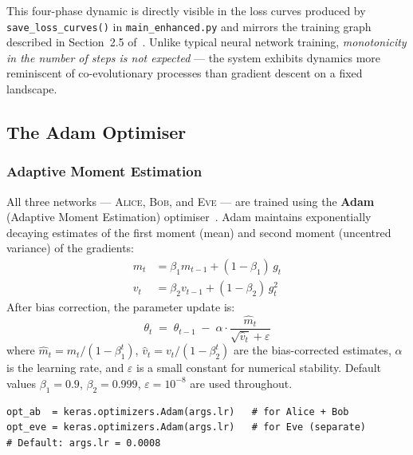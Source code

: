 \documentclass[12pt, a4paper]{article}
\newcommand{\alice}{\textsc{Alice}}
\newcommand{\bob}{\textsc{Bob}}
\newcommand{\eve}{\textsc{Eve}}
\newcommand{\code}[1]{\texttt{\color{CodeRed}#1}}
\begin{document}
This four-phase dynamic is directly visible in the loss curves produced
by \code{save\_loss\_curves()} in \code{main\_enhanced.py} and mirrors
the training graph described in Section~2.5 of~\cite{abadi2016learning}.
Unlike typical neural network training, \emph{monotonicity in the number
of steps is not expected} — the system exhibits dynamics more reminiscent
of co-evolutionary processes than gradient descent on a fixed landscape.

\subsection{The Adam Optimiser}
\label{subsec:adam}

\subsubsection*{Adaptive Moment Estimation}

All three networks — \alice{}, \bob{}, and \eve{} — are trained using the
\textbf{Adam} (Adaptive Moment Estimation) optimiser~\cite{kingma2014adam}.
Adam maintains exponentially decaying estimates of the first moment
(mean) and second moment (uncentred variance) of the gradients:
%
\begin{align}
  m_t &= \beta_1 m_{t-1} + (1-\beta_1)\, g_t
  \label{eq:adam_m} \\[4pt]
  v_t &= \beta_2 v_{t-1} + (1-\beta_2)\, g_t^2
  \label{eq:adam_v}
\end{align}
%
After bias correction, the parameter update is:
%
\begin{equation}
  \theta_t \;=\; \theta_{t-1}
  \;-\; \alpha \cdot
  \frac{\hat{m}_t}{\sqrt{\hat{v}_t} + \varepsilon}
  \label{eq:adam_update}
\end{equation}
%
where $\hat{m}_t = m_t / (1-\beta_1^t)$,
$\hat{v}_t = v_t / (1-\beta_2^t)$ are the bias-corrected estimates,
$\alpha$ is the learning rate, and $\varepsilon$ is a small constant for
numerical stability. Default values $\beta_1 = 0.9$, $\beta_2 = 0.999$,
$\varepsilon = 10^{-8}$ are used throughout.

\begin{lstlisting}[caption={Adam optimisers in \code{main\_enhanced.py}}]
opt_ab  = keras.optimizers.Adam(args.lr)   # for Alice + Bob
opt_eve = keras.optimizers.Adam(args.lr)   # for Eve (separate)
# Default: args.lr = 0.0008
\end{lstlisting}
\end{document}
